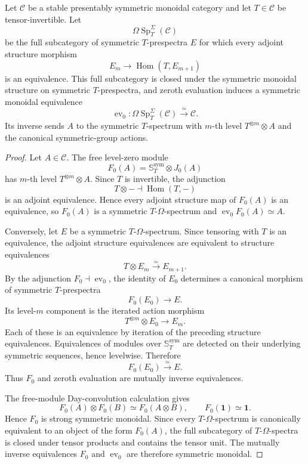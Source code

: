 \begin{lemma}
\label{lem:infinitesimal-invertible-coordinate-spectra}
Let $\mathcal C$ be a stable presentably symmetric monoidal category and let
$T\in\mathcal C$ be tensor-invertible.  Let
\[
    \Omega\operatorname{Sp}^{\Sigma}_T(\mathcal C)
\]
be the full subcategory of symmetric $T$-prespectra $E$ for which every
adjoint structure morphism
\[
    E_m\longrightarrow\operatorname{Hom}(T,E_{m+1})
\]
is an equivalence.  This full subcategory is closed under the symmetric
monoidal structure on symmetric $T$-prespectra, and zeroth evaluation induces
a symmetric monoidal equivalence
\[
    \operatorname{ev}_0:
    \Omega\operatorname{Sp}^{\Sigma}_T(\mathcal C)
    \xrightarrow{\simeq}
    \mathcal C.
\]
Its inverse sends $A$ to the symmetric $T$-spectrum with $m$-th level
$T^{\otimes m}\otimes A$ and the canonical symmetric-group actions.
\end{lemma}

\begin{proof}
Let $A\in\mathcal C$.  The free level-zero module
\[
    F_0(A)=\mathbb S_T^{\mathrm{sym}}\otimes J_0(A)
\]
has $m$-th level $T^{\otimes m}\otimes A$.  Since $T$ is invertible, the
adjunction
\[
    T\otimes-\dashv\operatorname{Hom}(T,-)
\]
is an adjoint equivalence.  Hence every adjoint structure map of $F_0(A)$ is
an equivalence, so $F_0(A)$ is a symmetric $T$-$\Omega$-spectrum and
$\operatorname{ev}_0F_0(A)\simeq A$.

Conversely, let $E$ be a symmetric $T$-$\Omega$-spectrum.  Since tensoring
with $T$ is an equivalence, the adjoint structure equivalences are equivalent
to structure equivalences
\[
    T\otimes E_m\xrightarrow{\simeq}E_{m+1}.
\]
By the adjunction $F_0\dashv\operatorname{ev}_0$, the identity of $E_0$
determines a canonical morphism of symmetric $T$-prespectra
\[
    F_0(E_0)\longrightarrow E.
\]
Its level-$m$ component is the iterated action morphism
\[
    T^{\otimes m}\otimes E_0\longrightarrow E_m.
\]
Each of these is an equivalence by iteration of the preceding structure
equivalences.  Equivalences of modules over
$\mathbb S_T^{\mathrm{sym}}$ are detected on their underlying symmetric
sequences, hence levelwise.  Therefore
\[
    F_0(E_0)\xrightarrow{\simeq}E.
\]
Thus $F_0$ and zeroth evaluation are mutually inverse equivalences.

The free-module Day-convolution calculation gives
\[
    F_0(A)\otimes F_0(B)
    \simeq
    F_0(A\otimes B),
    \qquad
    F_0(\mathbf 1)\simeq\mathbf 1.
\]
Hence $F_0$ is strong symmetric monoidal.  Since every
$T$-$\Omega$-spectrum is canonically equivalent to an object of the form
$F_0(A)$, the full subcategory of $T$-$\Omega$-spectra is closed under tensor
products and contains the tensor unit.  The mutually inverse equivalences
$F_0$ and $\operatorname{ev}_0$ are therefore symmetric monoidal.
\end{proof}

